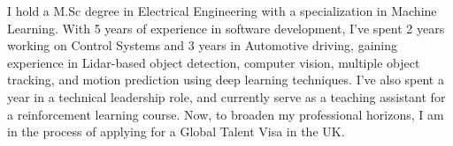 I hold a M.Sc degree in Electrical Engineering with a specialization in Machine Learning. With 5 years of experience in software development, I've spent 2 years working on Control Systems and 3 years in Automotive driving, gaining experience in Lidar-based object detection, computer vision, multiple object tracking, and motion prediction using deep learning techniques. I've also spent a year in a technical leadership role, and currently serve as a teaching assistant for a reinforcement learning course. Now, to broaden my professional horizons, I am in the process of applying for a Global Talent Visa in the UK.